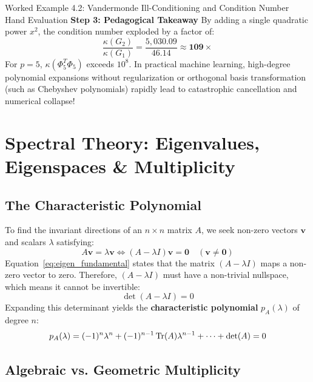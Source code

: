 \begin{examplebox}{Worked Example 4.2: Vandermonde Ill-Conditioning and Condition Number Hand Evaluation}
\textbf{Step 3: Pedagogical Takeaway}
By adding a single quadratic power $x^2$, the condition number exploded by a factor of:
\begin{equation*}
\frac{\kappa(G_2)}{\kappa(G_1)} = \frac{5{,}030.09}{46.14} \approx \mathbf{109 \times}
\end{equation*}
For $p = 5$, $\kappa(\Phi_5^T \Phi_5)$ exceeds $10^8$. In practical machine learning, high-degree polynomial expansions without regularization or orthogonal basis transformation (such as Chebyshev polynomials) rapidly lead to catastrophic cancellation and numerical collapse!
\end{examplebox}

\section{Spectral Theory: Eigenvalues, Eigenspaces \& Multiplicity}

\subsection{The Characteristic Polynomial}
To find the invariant directions of an $n \times n$ matrix $A$, we seek non-zero vectors $\mathbf{v}$ and scalars $\lambda$ satisfying:
\begin{equation}
A\mathbf{v} = \lambda \mathbf{v} \iff (A - \lambda I)\mathbf{v} = \mathbf{0} \quad (\mathbf{v} \ne \mathbf{0})
\label{eq:eigen_fundamental}
\end{equation}
Equation~\eqref{eq:eigen_fundamental} states that the matrix $(A - \lambda I)$ maps a non-zero vector to zero. Therefore, $(A - \lambda I)$ must have a non-trivial nullspace, which means it cannot be invertible:
\begin{equation}
\det(A - \lambda I) = 0
\label{eq:char_eq}
\end{equation}
Expanding this determinant yields the \textbf{characteristic polynomial} $p_A(\lambda)$ of degree $n$:
\begin{equation}
p_A(\lambda) = (-1)^n \lambda^n + (-1)^{n-1} \operatorname{Tr}(A) \lambda^{n-1} + \dots + \det(A) = 0
\end{equation}

\subsection{Algebraic vs. Geometric Multiplicity}

